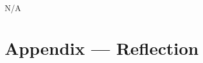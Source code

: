 \documentclass[12pt, titlepage]{article}
\begin{document}
N/A

\newpage


\section{Appendix --- Reflection}


\end{document}
